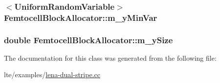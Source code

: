 \subsubsection[{\texorpdfstring{m\+\_\+y\+Min\+Var}{m_yMinVar}}]{$<${\bf Uniform\+Random\+Variable}$>$ Femtocell\+Block\+Allocator\+::m\+\_\+y\+Min\+Var\hspace{0.3cm}{\ttfamily [private]}}\hypertarget{classFemtocellBlockAllocator_a4427bd24572e6271bd8db991a4a4670b}{}\label{classFemtocellBlockAllocator_a4427bd24572e6271bd8db991a4a4670b}
\subsubsection[{\texorpdfstring{m\+\_\+y\+Size}{m_ySize}}]{\setlength{\rightskip}{0pt plus 5cm}double Femtocell\+Block\+Allocator\+::m\+\_\+y\+Size\hspace{0.3cm}{\ttfamily [private]}}\hypertarget{classFemtocellBlockAllocator_ae8981a521b14d95bfdc150a3b970b5f1}{}\label{classFemtocellBlockAllocator_ae8981a521b14d95bfdc150a3b970b5f1}


The documentation for this class was generated from the following file\+:\begin{DoxyCompactItemize}
\item 
lte/examples/\hyperlink{lena-dual-stripe_8cc}{lena-\/dual-\/stripe.\+cc}\end{DoxyCompactItemize}

